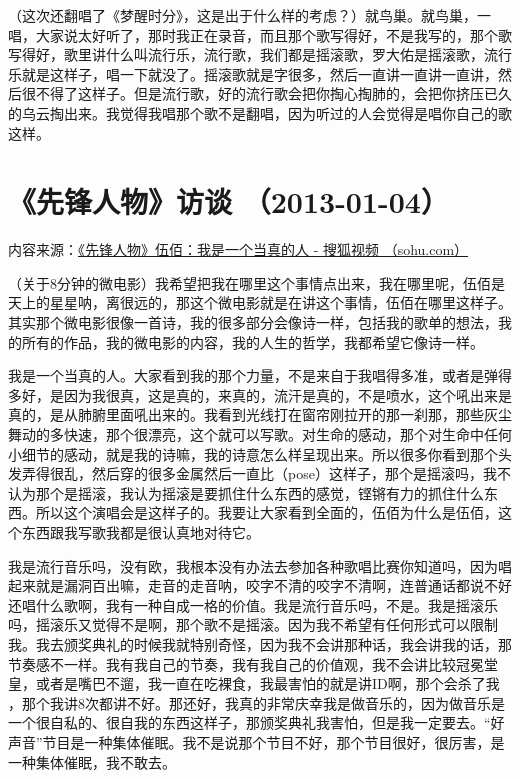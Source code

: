 \documentclass[UTF8,a4paper,oneside,twocolumn,12pt]{ctexbook}
\begin{document}
（这次还翻唱了《梦醒时分》，这是出于什么样的考虑？）就鸟巢。就鸟巢，一唱，大家说太好听了，那时我正在录音，而且那个歌写得好，不是我写的，那个歌写得好，歌里讲什么叫流行乐，流行歌，我们都是摇滚歌，罗大佑是摇滚歌，流行乐就是这样子，唱一下就没了。摇滚歌就是字很多，然后一直讲一直讲一直讲，然后很不得了这样子。但是流行歌，好的流行歌会把你掏心掏肺的，会把你挤压已久的乌云掏出来。我觉得我唱那个歌不是翻唱，因为听过的人会觉得是唱你自己的歌这样。

\section{《先锋人物》访谈 （2013-01-04）}
内容来源：\href{https://tv.sohu.com/v/MjAxMzAxMDQvbjM2MjMwNjQ1NC5zaHRtbA==.html}{《先锋人物》伍佰：我是一个当真的人 - 搜狐视频 （sohu.com）}

（关于8分钟的微电影）我希望把我在哪里这个事情点出来，我在哪里呢，伍佰是天上的星星呐，离很远的，那这个微电影就是在讲这个事情，伍佰在哪里这样子。其实那个微电影很像一首诗，我的很多部分会像诗一样，包括我的歌单的想法，我的所有的作品，我的微电影的内容，我的人生的哲学，我都希望它像诗一样。

我是一个当真的人。大家看到我的那个力量，不是来自于我唱得多准，或者是弹得多好，是因为我很真，这是真的，来真的，流汗是真的，不是喷水，这个吼出来是真的，是从肺腑里面吼出来的。我看到光线打在窗帘刚拉开的那一刹那，那些灰尘舞动的多快速，那个很漂亮，这个就可以写歌。对生命的感动，那个对生命中任何小细节的感动，就是我的诗嘛，我的诗意怎么样呈现出来。所以很多你看到那个头发弄得很乱，然后穿的很多金属然后一直比（pose）这样子，那个是摇滚吗，我不认为那个是摇滚，我认为摇滚是要抓住什么东西的感觉，铿锵有力的抓住什么东西。所以这个演唱会是这样子的。我要让大家看到全面的，伍佰为什么是伍佰，这个东西跟我写歌我都是很认真地对待它。

我是流行音乐吗，没有欧，我根本没有办法去参加各种歌唱比赛你知道吗，因为唱起来就是漏洞百出嘛，走音的走音呐，咬字不清的咬字不清啊，连普通话都说不好还唱什么歌啊，我有一种自成一格的价值。我是流行音乐吗，不是。我是摇滚乐吗，摇滚乐又觉得不是啊，那个歌不是摇滚。因为我不希望有任何形式可以限制我。我去颁奖典礼的时候我就特别奇怪，因为我不会讲那种话，我会讲我的话，那节奏感不一样。我有我自己的节奏，我有我自己的价值观，我不会讲比较冠冕堂皇，或者是嘴巴不遛，我一直在吃裸食，我最害怕的就是讲ID啊，那个会杀了我 ，那个我讲8次都讲不好。那还好，我真的非常庆幸我是做音乐的，因为做音乐是一个很自私的、很自我的东西这样子，那颁奖典礼我害怕，但是我一定要去。“好声音”节目是一种集体催眠。我不是说那个节目不好，那个节目很好，很厉害，是一种集体催眠，我不敢去。
\end{document}
